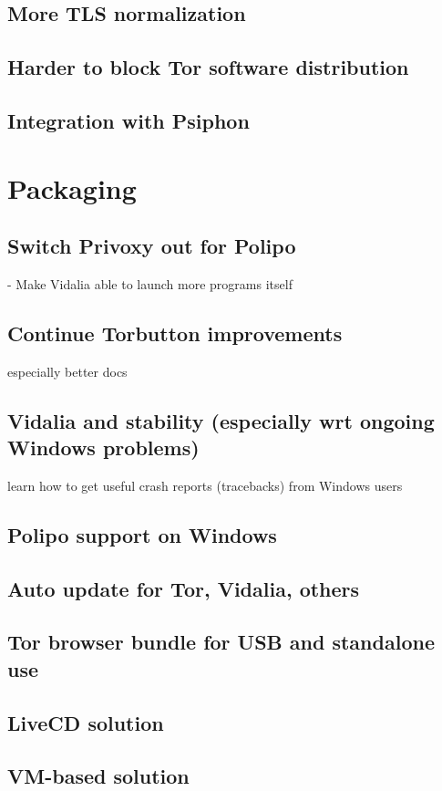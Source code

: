 \documentclass{article}
\begin{document}
\subsection{More TLS normalization}
\subsection{Harder to block Tor software distribution}
\subsection{Integration with Psiphon}
\section{Packaging}
\subsection{Switch Privoxy out for Polipo}
      - Make Vidalia able to launch more programs itself
\subsection{Continue Torbutton improvements}
      especially better docs
\subsection{Vidalia and stability (especially wrt ongoing Windows problems)}
      learn how to get useful crash reports (tracebacks) from Windows users
\subsection{Polipo support on Windows}
\subsection{Auto update for Tor, Vidalia, others}
\subsection{Tor browser bundle for USB and standalone use}
\subsection{LiveCD solution}
\subsection{VM-based solution}
\end{document}
